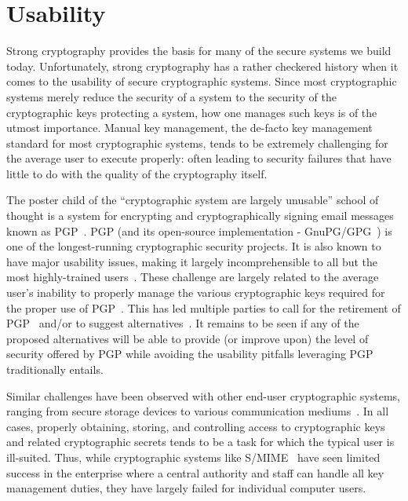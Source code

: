 \section{Usability}
\label{chap:background:usability}

Strong cryptography provides the basis for many of the secure systems
we build today. Unfortunately, strong cryptography has a rather
checkered history when it comes to the usability of secure
cryptographic systems. Since most cryptographic systems merely reduce
the security of a system to the security of the cryptographic keys
protecting a system, how one manages such keys is of the utmost
importance. Manual key management, the de-facto key management
standard for most cryptographic systems, tends to be extremely
challenging for the average user to execute properly: often leading to
security failures that have little to do with the quality of the
cryptography itself.

The poster child of the ``cryptographic system are largely unusable''
school of thought is a system for encrypting and cryptographically
signing email messages known as PGP~\cite{callas2007}. PGP (and its
open-source implementation - GnuPG/GPG~\cite{gnupg}) is one of the
longest-running cryptographic security projects. It is also known to
have major usability issues, making it largely incomprehensible to all
but the most highly-trained users~\cite{whitten1999}. These challenge
are largely related to the average user's inability to properly manage
the various cryptographic keys required for the proper use of
PGP~\cite{green-challenge}. This has led multiple parties to call for
the retirement of PGP~\cite{green-pgp} and/or to suggest
alternatives~\cite{borisov2004, mailpile, openwhisper,
  google-endtoend}. It remains to be seen if any of the proposed
alternatives will be able to provide (or improve upon) the level of
security offered by PGP while avoiding the usability pitfalls
leveraging PGP traditionally entails.

Similar challenges have been observed with other end-user
cryptographic systems, ranging from secure storage devices to various
communication mediums~\cite{sweikata2009}. In all cases, properly
obtaining, storing, and controlling access to cryptographic keys and
related cryptographic secrets tends to be a task for which the typical
user is ill-suited. Thus, while cryptographic systems like
S/MIME~\cite{ramsdell-rfc5751} have seen limited success in the
enterprise where a central authority and staff can handle all key
management duties, they have largely failed for individual computer
users.

